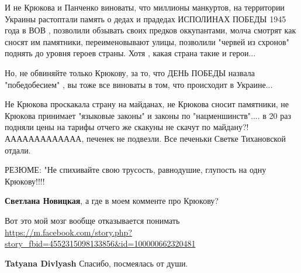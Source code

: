 \begin{itemize}
\begin{itemize}
И не Крюкова и Панченко виноваты, что миллионы манкуртов, на территории Украины
растоптали память о дедах и прадедах ИСПОЛИНАХ ПОБЕДЫ 1945 года в ВОВ ,
позволили обзывать своих предков оккупантами, молча смотрят как сносят им
памятники, переименовывают улицы, позволили "червей из схронов" поднять до
уровня героев страны. Хотя , какая страна такие и герои... 

Но, не обвиняйте только Крюкову, за то, что ДЕНЬ ПОБЕДЫ назвала "победобесием"
, вы тоже все виноваты в том, что происходит в Украине... 

Не Крюкова проскакала страну на майданах, не Крюкова сносит памятники, не
Крюкова принимает "языковые законы" и законы по "нацменшинств".... в 20 раз
подняли цены на тарифы отчего же скакуны не скачут по майдану?! ААААААААААААА,
печенек не подвезли. Все печеньки Светке Тихановской отдали. 

РЕЗЮМЕ: "Не спихивайте свою трусость, равнодушие, глупость на одну Крюкову!!!!

 
\textbf{Светлана Новицкая}, а где в моем комменте про Крюкову?

 
Вот это мой мозг вообще отказывается понимать
\url{https://m.facebook.com/story.php?story_fbid=4552315098133856&id=100000662320481}

 
\textbf{Tatyana Divlyash} Спасибо, посмеялась от души.

 

\end{itemize}
\end{itemize}
